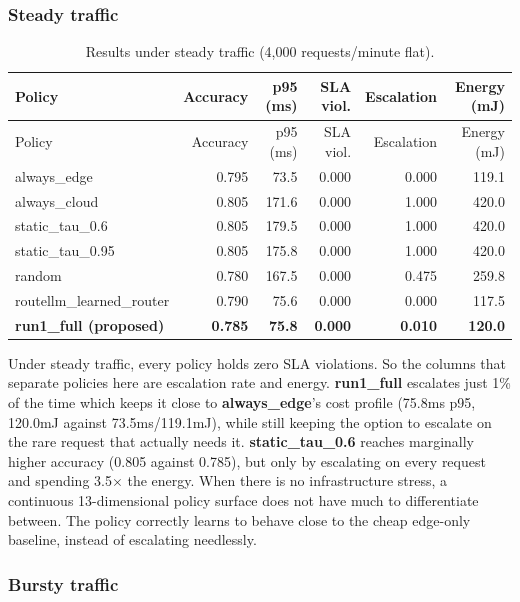 \hypertarget{steady-traffic}{%
\subsubsection{Steady traffic}\label{steady-traffic}}

\begin{longtable}{lrrrrr}
\caption{Results under steady traffic (4,000 requests/minute flat).}\label{tab:steady}\\
\toprule
Policy & Accuracy & p95 (ms) & SLA viol. & Escalation & Energy (mJ) \\
\midrule
\endfirsthead
\toprule
Policy & Accuracy & p95 (ms) & SLA viol. & Escalation & Energy (mJ) \\
\midrule
\endhead
always\_edge & 0.795 & 73.5 & 0.000 & 0.000 & 119.1 \\
always\_cloud & 0.805 & 171.6 & 0.000 & 1.000 & 420.0 \\
static\_tau\_0.6 & 0.805 & 179.5 & 0.000 & 1.000 & 420.0 \\
static\_tau\_0.95 & 0.805 & 175.8 & 0.000 & 1.000 & 420.0 \\
random & 0.780 & 167.5 & 0.000 & 0.475 & 259.8 \\
routellm\_learned\_router & 0.790 & 75.6 & 0.000 & 0.000 & 117.5 \\
\textbf{run1\_full (proposed)} & \textbf{0.785} & \textbf{75.8} & \textbf{0.000} & \textbf{0.010} & \textbf{120.0} \\
\bottomrule
\end{longtable}

Under steady traffic, every policy holds zero SLA violations. So the
columns that separate policies here are escalation rate and
energy. \textbf{run1\_full} escalates just 1\% of the
time which keeps it close to \textbf{always\_edge}'s cost profile
(75.8ms p95, 120.0mJ against 73.5ms/119.1mJ), while still keeping the option to escalate on the rare request that actually needs it.
\textbf{static\_tau\_0.6} reaches marginally higher accuracy (0.805
against 0.785), but only by escalating on every request and spending
3.5$\times$ the energy. When there is no infrastructure stress, a
continuous 13-dimensional policy surface does not have much to
differentiate between. The policy correctly learns to behave close to the
cheap edge-only baseline, instead of escalating needlessly.

\hypertarget{bursty-traffic}{%
\subsubsection{Bursty traffic}\label{bursty-traffic}}

